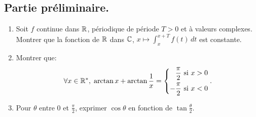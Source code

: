 \subsection*{Partie préliminaire.}
\begin{enumerate}
 \item Soit $f$ continue dans $\mathbb{R}$, périodique de période $T>0$ et à valeurs complexes.\newline
Montrer que la fonction de $\mathbb{R}$ dans $\mathbb{C}$, $ x \mapsto \int_x^{x+T}f(t)\, dt$ est constante.

 \item Montrer que:
\[
 \forall x \in \mathbb{R}^*, \; \arctan x + \arctan \frac{1}{x} =
 \left\lbrace 
 \begin{aligned}
  \frac{\pi}{2} &\text{ si } x > 0 \\
  -\frac{\pi}{2} &\text{ si } x < 0
 \end{aligned}
 \right. .
\]

 \item Pour $\theta$ entre $0$ et $\frac{\pi}{2}$, exprimer $\cos \theta$ en fonction de $\tan \frac{\theta}{2}$.
\end{enumerate}

